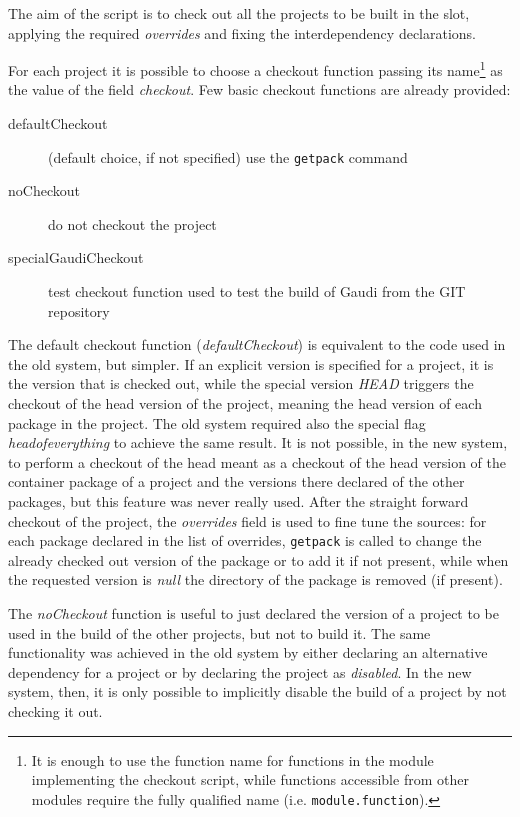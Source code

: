 \documentclass{lhcbnote}
\begin{document}
The aim of the script is to check out all the projects to be built in the slot,
applying the required \emph{overrides} and fixing the interdependency
declarations.

For each project it is possible to choose a checkout function passing its
name\footnote{It is enough to use the function name for functions in the module
implementing the checkout script, while functions accessible from other modules
require the fully qualified name (i.e. \texttt{module.function}).} as the value
of the field \emph{checkout}.  Few basic checkout functions are already
provided:
\begin{description}
  \item[defaultCheckout] (default choice, if not specified) use the
\texttt{getpack} command
  \item[noCheckout] do not checkout the project
  \item[specialGaudiCheckout] test checkout function used to test the build of
  Gaudi from the GIT repository
\end{description}

The default checkout function (\emph{defaultCheckout}) is equivalent to the code
used in the old system, but simpler.  If an explicit version is specified for a
project, it is the version that is checked out, while the special version
\emph{HEAD} triggers the checkout of the head version of the project, meaning
the head version of each package in the project.  The old system required also
the special flag \emph{headofeverything} to achieve the same result.  It is not
possible, in the new system, to perform a checkout of the head meant as a
checkout of the head version of the container package of a project and the
versions there declared of the other packages, but this feature was never really
used.  After the straight forward checkout of the project, the \emph{overrides}
field is used to fine tune the sources: for each package declared in the list of
overrides, \texttt{getpack} is called to change the already checked out version
of the package or to add it if not present, while when the requested version is
\emph{null} the directory of the package is removed (if present).

The \emph{noCheckout} function is useful to just declared the version of a
project to be used in the build of the other projects, but not to build it.  The
same functionality was achieved in the old system by either declaring an
alternative dependency for a project or by declaring the project as
\emph{disabled}.  In the new system, then, it is only possible to implicitly
disable the build of a project by not checking it out.
\end{document}
